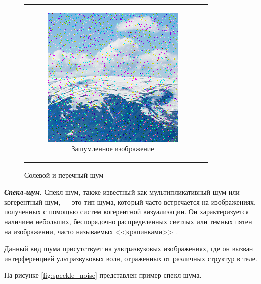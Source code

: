\begin{figure}[h!]
\begin{tabular}{cc}
\begin{subfigure}{0.45\textwidth}
      \includegraphics[width=\linewidth]{inc/analysis/noises/saltpepper.png}
      \caption{Зашумленное изображение}
    \end{subfigure} \\
  \end{tabular}
  \caption{Солевой и перечный шум}
  \label{fig:saltpepper_noise}
\end{figure}

\textit{\textbf{Спекл-шум}}. Спекл-шум, также известный как мультипликативный шум или когерентный шум, --- это тип шума, который часто встречается на изображениях, полученных с помощью систем когерентной визуализации. Он характеризуется наличием небольших, беспорядочно распределенных светлых или темных пятен на изображении, часто называемых <<крапинками>> \cite{noisetypes}.

Данный вид шума присутствует на ультразвуковых изображениях, где он вызван интерференцией ультразвуковых волн, отраженных от различных структур в теле.

На рисунке \ref{fig:speckle_noise} представлен пример спекл-шума.

